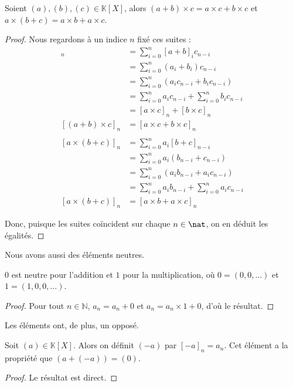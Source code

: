 \begin{prop}
    Soient $(a),(b),(c)\in\mathbb K[X]$, alors $(a+b)\times c = a\times c + b \times c$ et $a\times (b+c)=a\times b + a \times c$.
\end{prop}
\begin{proof}
    Nous regardons à un indice $n$ fixé ces suites :
    \begin{align*}
        [(a+b)\times c]_n &= \sum_{i=0}^n [a+b]_i c_{n-i}\\
        &= \sum_{i=0}^n (a_i+b_i) c_{n-i}\\
        &= \sum_{i=0}^n (a_i c_{n-i}+b_i c_{n-i})\\
        &= \sum_{i=0}^n a_i c_{n-i}+\sum_{i=0}^n b_i c_{n-i}\\
        &= [a\times c]_n + [b\times c]_n\\
        [(a+b)\times c]_n &= [a\times c + b\times c]_n\\
        \\
        [a\times (b+c)]_n &= \sum_{i=0}^n a_i [b+c]_{n-i}\\
        &= \sum_{i=0}^n a_i (b_{n-i}+c_{n-i})\\
        &= \sum_{i=0}^n (a_i b_{n-i}+a_i c_{n-i})\\
        &= \sum_{i=0}^n a_i b_{n-i}+\sum_{i=0}^n a_i c_{n-i}\\
        [a\times (b+c)]_n&=[a\times b + a \times c]_n
    \end{align*}
    
    Donc, puisque les suites coïncident sur chaque $n\in\nat$, on en déduit les égalités.
\end{proof}

Nous avons aussi des éléments neutres.

\begin{prop}
    $0$ est neutre pour l'addition et $1$ pour la multiplication, où $0=(0,0,\ldots)$ et $1=(1,0,0,\ldots)$.
\end{prop}

\begin{proof}
    Pour tout $n\in\mathbb N$, $a_n=a_n+0$ et $a_n=a_n\times 1 + 0$, d'où le résultat.
\end{proof}

Les éléments ont, de plus, un opposé.

\begin{prop}
    Soit $(a)\in\mathbb K[X]$. Alors on définit $(-a)$ par $[-a]_n=a_n$. Cet élément a la propriété que $(a+(-a))=(0)$.
\end{prop}
\begin{proof}
    Le résultat est direct.
\end{proof}

